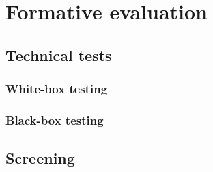 \chapter{Formative evaluation}
\label{ch:evaluation}

\section{Technical tests}
\label{technicaltests}

\subsection{White-box testing}

\subsection{Black-box testing}

\section{Screening}
\label{sec:screening}
